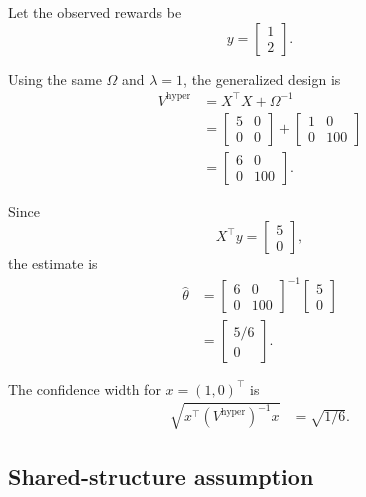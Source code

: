 \documentclass{article} %
\begin{document}
Let the observed rewards be
\begin{equation}
\label{eq:hyper-example-y}
y=
\begin{bmatrix}
1\\
2
\end{bmatrix}.
\end{equation}

Using the same \(\Omega\) and \(\lambda=1\), the generalized design is
\begin{align}
\label{eq:hyper-example-V}
V^{\mathrm{hyper}}
&=
X^\top X+\Omega^{-1}
\\
&=
\begin{bmatrix}
5&0\\
0&0
\end{bmatrix}
+
\begin{bmatrix}
1&0\\
0&100
\end{bmatrix}
\\
&=
\begin{bmatrix}
6&0\\
0&100
\end{bmatrix}.
\end{align}

Since
\begin{equation}
\label{eq:hyper-example-Xty}
X^\top y=
\begin{bmatrix}
5\\
0
\end{bmatrix},
\end{equation}
the estimate is
\begin{align}
\label{eq:hyper-example-theta}
\widehat{\theta}
&=
\begin{bmatrix}
6&0\\
0&100
\end{bmatrix}^{-1}
\begin{bmatrix}
5\\
0
\end{bmatrix}
\\
&=
\begin{bmatrix}
5/6\\
0
\end{bmatrix}.
\end{align}

The confidence width for \(x=(1,0)^\top\) is
\begin{align}
\label{eq:hyper-example-width}
\sqrt{x^\top (V^{\mathrm{hyper}})^{-1}x}
&=
\sqrt{1/6}.
\end{align}

\subsection{Shared-structure assumption}
\end{document}
